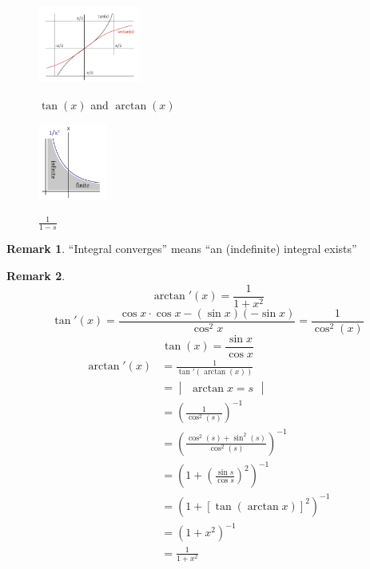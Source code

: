 \documentclass[a4paper,landscape,twocolumn]{article}
\theoremstyle{definition}
\newtheorem{rem}{Remark}
\begin{document}
\begin{figure}[p]
  \begin{center}
    \includegraphics[width=0.3\textwidth]{img/tanarctan.pdf}
    \caption{$\tan(x)$ and $\arctan(x)$}
    \label{img:tanarctan}
    \includegraphics[width=0.2\textwidth]{img/1divsmin1.pdf}
    \caption{$\frac{1}{1 - s}$}
    \label{img:1divs}
  \end{center}
\end{figure}

\begin{rem}
  \enquote{Integral converges} means \enquote{an (indefinite) integral exists}
\end{rem}

\begin{rem}
  \[ \arctan'(x) = \frac{1}{1 + x^2} \]
  \[ \tan'(x) = \frac{\cos{x} \cdot \cos{x} - (\sin{x}) (-\sin{x})}{\cos^2{x}} = \frac{1}{\cos^2(x)} \]
  \[ \tan(x) = \frac{\sin{x}}{\cos{x}} \]
  \begin{align*}
    \arctan'(x)
      &= \frac{1}{\tan'(\arctan(x))} \\
      &= \begin{vmatrix} \arctan{x} = s \end{vmatrix} \\
      &= \left(\frac{1}{\cos^2(s)}\right)^{-1} \\
      &= \left(\frac{\cos^2(s) + \sin^2(s)}{\cos^2(s)}\right)^{-1} \\
      &= \left(1 + \left(\frac{\sin{s}}{\cos{s}}\right)^2\right)^{-1} \\
      &= \left(1 + \left[\tan(\arctan{x})\right]^2\right)^{-1} \\
      &= (1 + x^2)^{-1} \\
      &= \frac{1}{1 + x^2}
  \end{align*}
\end{rem}
\end{document}
